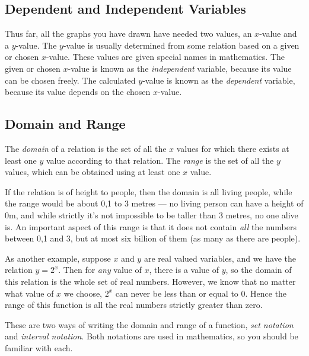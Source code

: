             \subsection{ Dependent and Independent Variables}
            \nopagebreak
        \label{m39337*id235764}Thus far, all the graphs you have drawn have needed two values, an $x$-value and a $y$-value. The $y$-value is usually determined from some relation based on a given or chosen $x$-value. These values are given special names in mathematics. The given or chosen $x$-value is known as the \textsl{independent} variable, because its value can be chosen freely. The calculated $y$-value is known as the \textsl{dependent} variable, because its value depends on the chosen $x$-value.\par 
      \label{m39337*uid41}
            \subsection{ Domain and Range}
            \nopagebreak
        \label{m39337*id235855}The \textsl{domain} of a relation is the set of all the $x$ values for which there exists at least one $y$ value according to that relation. The \textsl{range} is the set of all the $y$ values, which can be obtained using at least one $x$ value.\par 
        \label{m39337*id235908}If the relation is of height to people, then the domain is all living people, while the range would be about 0,1 to 3 metres --- no living person can have a height of 0m, and while strictly it's not impossible to be taller than 3 metres, no one alive is. An important aspect of this range is that it does not contain \textsl{all} the numbers between 0,1 and 3, but at most six billion of them (as many as there are people).\par 
        \label{m39337*id235939}As another example, suppose $x$ and $y$ are real valued variables, and we have the relation $y={2}^{x}$. Then for \textsl{any} value of $x$, there is a value of $y$, so the domain of this relation is the whole set of real numbers. However, we know that no matter what value of $x$ we choose, ${2}^{x}$ can never be less than or equal to 0. Hence the range of this function is all the real numbers strictly greater than zero.\par 
        \label{m39337*id236030}These are two ways of writing the domain and range of a function, \textsl{set notation} and \textsl{interval notation}. Both notations are used in mathematics, so you should be familiar with each.\par 
        \label{m39337*uid42}
